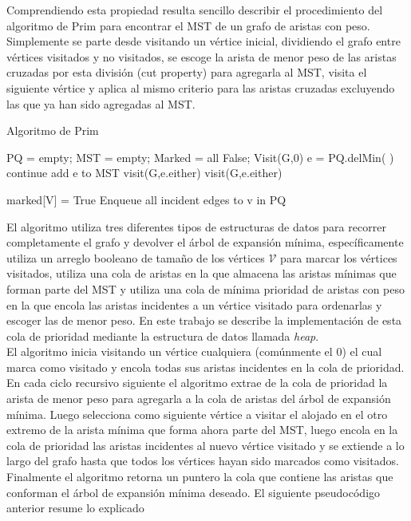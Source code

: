 \documentclass[letterpaper]{article}
\begin{document}
Comprendiendo esta propiedad resulta sencillo describir el procedimiento del algoritmo de Prim para encontrar el MST de un grafo de aristas con peso. Simplemente se parte desde visitando un vértice inicial, dividiendo el grafo entre vértices visitados y no visitados, se escoge la arista de menor peso de las aristas cruzadas por esta división (cut property) para agregarla al MST, visita el siguiente vértice y aplica al mismo criterio para las aristas cruzadas excluyendo las que ya han sido agregadas al MST.

\begin{algorithm}[h]
\caption{Algoritmo de Prim}
\label{Djikstra}
\begin{algorithmic}
    \State PQ = empty;
    \State MST = empty;
    \State Marked = all False;
    Visit(G,0)
        \State e = PQ.delMin( )
         continue\EndIf
       	\State add e to MST
       	 visit(G,e.either)\EndIf
       	 visit(G,e.either)\EndIf
    \EndWhile    
\EndProcedure

	\State marked[V] = True
	\State Enqueue all incident edges to v in PQ
\EndProcedure
\end{algorithmic}
\end{algorithm}

 El algoritmo utiliza tres diferentes tipos de estructuras de datos para recorrer completamente el grafo y devolver el árbol de expansión mínima, específicamente utiliza un arreglo booleano de tamaño de los vértices $\mathcal{V}$ para marcar los vértices visitados, utiliza una cola de aristas en la que almacena las aristas mínimas que forman parte del MST y utiliza una cola de mínima prioridad de aristas con peso en la que encola las aristas incidentes a un vértice visitado para ordenarlas y escoger las de menor peso. En este trabajo se describe la implementación de esta cola de prioridad mediante la estructura de datos llamada \textit{heap}.\\

El algoritmo inicia visitando un vértice cualquiera (comúnmente el 0) el cual marca como visitado y encola todas sus aristas incidentes en la cola de prioridad. En cada ciclo recursivo siguiente el algoritmo extrae de la cola de prioridad la arista de menor peso para agregarla a la cola de aristas del árbol de expansión mínima. Luego selecciona como siguiente vértice a visitar el alojado en el otro extremo de la arista mínima que forma ahora parte del MST, luego encola en la cola de prioridad las aristas incidentes al nuevo vértice visitado y se extiende a lo largo del grafo hasta que todos los vértices hayan sido marcados como visitados. Finalmente el algoritmo retorna un puntero la cola que contiene las aristas que conforman el árbol de expansión mínima deseado. El siguiente pseudocódigo anterior resume lo explicado
\end{document}
